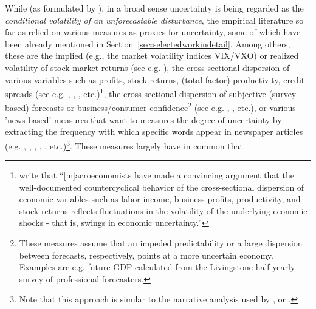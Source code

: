 \documentclass[a4paper,11pt,listof=nochaptergap,oneside,pointednumbers,bibtotoc,bigheadings,liststotoc,hidelinks]{scrbook}
\theoremstyle{mysatz}
\theoremstyle{mydefinition}
\theoremstyle{mytheorem}
\theoremstyle{mybemerkung}
\begin{document}
While (as formulated by \citealp{joetsetal:17}), in a broad sense uncertainty is being regarded as the \textit{conditional volatility of an unforecastable disturbance}, the empirical literature so far as relied on various measures as proxies for uncertainty, some of which have been already mentioned in Section~\ref{sec:selectedworkindetail}. Among others, these are the implied (e.g., the market volatility indices VIX/VXO) or realized volatility of stock market returns (see e.g. \citealp{bloom:09}), the cross-sectional dispersion of various variables such as profits, stock returns, (total factor) productivity, credit spreads (see e.g. \citealp{bloom:09}, \citet{gilchristetal:14}, \citet{bloometal:12}, etc.)\footnote{\citet[p. 1]{gilchristetal:14} write that ``[m]acroeconomists have made a convincing argument that the well-documented countercyclical behavior of the cross-sectional dispersion of economic variables such as labor income, business profits, productivity, and stock returns reflects fluctuations in the volatility of the underlying economic shocks - that is, swings in economic uncertainty.''}, the cross-sectional dispersion of subjective (survey-based) forecasts or business/consumer confidence\footnote{These measures assume that an impeded predictability or a large dispersion between forecasts, respectively, points at a more uncertain economy. Examples are e.g. future GDP calculated from the Livingstone half-yearly survey of professional forecasters.} (see e.g. \citet{bachmannetal:13}, \citet{leducandliu:16}, etc.), or various 'news-based' measures that want to measures the degree of uncertainty by extracting the frequency with which specific words appear in newspaper articles (e.g. \citet{alexopoulosandcohen:09}, \citet{bakeretal:15}, \citet{moore:17}, \citet{bontempietal:16}, \citet{castelnuovoandtran:17}, etc.)\footnote{Note that this approach is similar to the narrative analysis used by \citet{romerandromer:04}, \citet{romandrom:17} or \citet{ramey:09}.}. These measures largely have in common that 
\end{document}
